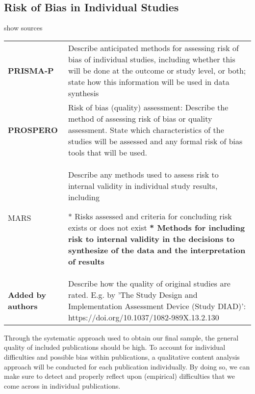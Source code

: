 \documentclass[
]{article}
\begin{document}
\hypertarget{risk-of-bias-in-individual-studies}{%
\subsection{Risk of Bias in Individual
Studies}\label{risk-of-bias-in-individual-studies}}

show sources

\hypertarget{robiis}{}
\begin{collapse}

\begin{table}[H]
\centering
\begin{tabular}{>{}l|l}
\hline
\cellcolor[HTML]{ececec}{source} & \cellcolor[HTML]{ececec}{description}\\
\hline
\textbf{PRISMA-P} & Describe anticipated methods for assessing risk of bias of individual studies, including whether this will be done at the outcome or study level, or both; state how this information will be used in data synthesis\\
\hline
\textbf{PROSPERO} & Risk of bias (quality) assessment: Describe the method of assessing risk of bias or quality assessment. State which characteristics of the studies will be assessed and any formal risk of bias tools that will be used.\\
\hline
MARS & Describe any methods used to assess risk to internal validity in individual study results, including

* Risks assessed and criteria for concluding risk exists or does not exist
\textbf{* Methods for including risk to internal validity in the decisions to synthesize of the data and the interpretation of results}\\
\hline
\textbf{Added by authors} & Describe how the quality of original studies are rated. E.g. by 'The Study Design and Implementation Assessment Device (Study DIAD)': https://doi.org/10.1037/1082-989X.13.2.130\\
\hline
\end{tabular}
\end{table}

\end{collapse}

Through the systematic approach used to obtain our final sample, the
general quality of included publications should be high. To account for
individual difficulties and possible bias within publications, a
qualitative content analysis approach will be conducted for each
publication individually. By doing so, we can make sure to detect and
properly reflect upon (empirical) difficulties that we come across in
individual publications.
\end{document}
